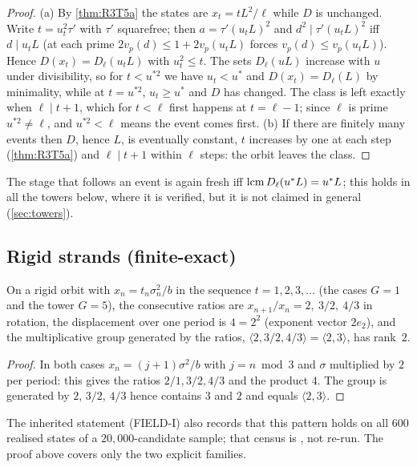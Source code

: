 \begin{proof}
(a) By \cref{thm:R3T5a} the states are $x_t=tL^2/\ell$ while $D$ is unchanged. Write $t=u_t^2\tau'$ with $\tau'$ squarefree; then $a=\tau'(u_tL)^2$ and $d^2\mid\tau'(u_tL)^2$ iff $d\mid u_tL$ (at each prime $2v_p(d)\le1+2v_p(u_tL)$ forces $v_p(d)\le v_p(u_tL)$). Hence $D(x_t)=D_\ell(u_tL)$ with $u_t^2\le t$. The sets $D_\ell(uL)$ increase with $u$ under divisibility, so for $t<u^{*2}$ we have $u_t<u^*$ and $D(x_t)=D_\ell(L)$ by minimality, while at $t=u^{*2}$, $u_t\ge u^*$ and $D$ has changed. The class is left exactly when $\ell\mid t+1$, which for $t<\ell$ first happens at $t=\ell-1$; since $\ell$ is prime $u^{*2}\ne\ell$, and $u^{*2}<\ell$ means the event comes first. (b) If there are finitely many events then $D$, hence $L$, is eventually constant, $t$ increases by one at each step (\cref{thm:R3T5a}) and $\ell\mid t+1$ within $\ell$ steps: the orbit leaves the class. \qedhere
\end{proof}
\begin{remark}
The stage that follows an event is again fresh iff $\operatorname{lcm} D_\ell(u^*L)=u^*L$; this holds in all the towers below, where it is verified, but it is not claimed in general (\cref{sec:towers}).
\end{remark}

\subsection{Rigid strands (finite-exact)}
\begin{proposition}\label{prop:BT11}
On a rigid orbit with $x_n=t_n\sigma_n^2/b$ in the sequence $t=1,2,3,\ldots$ (the cases $G=1$ and the tower $G=5$), the consecutive ratios are $x_{n+1}/x_n=2,\ 3/2,\ 4/3$ in rotation, the displacement over one period is $4=2^2$ (exponent vector $2e_2$), and the multiplicative group generated by the ratios, $\langle2,3/2,4/3\rangle=\langle2,3\rangle$, has rank~$2$.
\end{proposition}
\begin{proof}
In both cases $x_n=(j+1)\sigma^2/b$ with $j=n\bmod3$ and $\sigma$ multiplied by $2$ per period: this gives the ratios $2/1,3/2,4/3$ and the product $4$. The group is generated by $2$, $3/2$, $4/3$ hence contains $3$ and $2$ and equals $\langle2,3\rangle$. \qedhere
\end{proof}
\begin{remark}
The inherited statement (FIELD-I) also records that this pattern holds on all $600$ realised states of a $20{,}000$-candidate sample; that census is , not re-run. The proof above covers only the two explicit families.
\end{remark}
